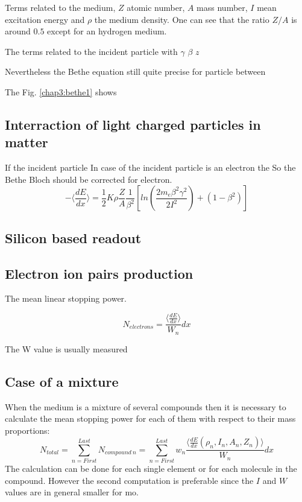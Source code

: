 \begin{refsection}
	Terms related to the medium, \(Z\) atomic number, \(A\) mass number, \(I\) mean excitation energy and \(\rho \) the medium density.
	One can see that the ratio \(Z/A\) is around \(0.5\) except for an hydrogen medium.

	The terms related to the incident particle with \(\gamma\) \(\beta\) \(z\)

	Nevertheless the Bethe equation still quite precise for particle between

	The Fig. \ref{chap3:bethe1} shows

	

	\subsection{Interraction of light charged particles in matter}
	If the incident particle
	In case of the incident particle is an electron the
	So the Bethe Bloch should be corrected for electron.\cite{Rieke1972}
	\begin{equation}
		- \bigg \langle \frac{dE}{dx} \bigg \rangle = \frac{1}{2} K \rho \frac{Z}{A} \frac{1}{\beta^{2}} \left[ln \left(\frac{2 m_{e} \beta^{2} \gamma^{2}}{2I^{2}} \right) + (1 - \beta^{2})\right]
	\end{equation}

	\subsection{Silicon based readout}
	
	

	\subsection{Electron ion pairs production}
	The mean linear stopping power.

	\cite[]{Weiss1955}
	\cite[]{Bichsel1979}
	\begin{equation}
		N_{electrons}= \frac{\big \langle \frac{dE}{dx} \big \rangle}{W_{n}} dx
	\end{equation}

	

	The W value is usually measured

	\subsection{Case of a mixture}
	When the medium is a mixture of several compounds then it is necessary to calculate the mean stopping power for each of them with respect to their mass proportions:
	\begin{equation}
		N_{total}= \sum_{n= First}^{Last} N_{compound\ n}= \sum_{n= First}^{Last} w_{n} \frac{\big \langle \frac{dE}{dx}\left(\rho_{n},I_{n},A_{n},Z_{n}\right) \big \rangle}{W_{n}} dx
	\end{equation}
	The calculation can be done for each single element or for each molecule in the compound.
	However the second computation is preferable since the \(I\) and \(W\) values are in general smaller for mo.

\end{refsection}
